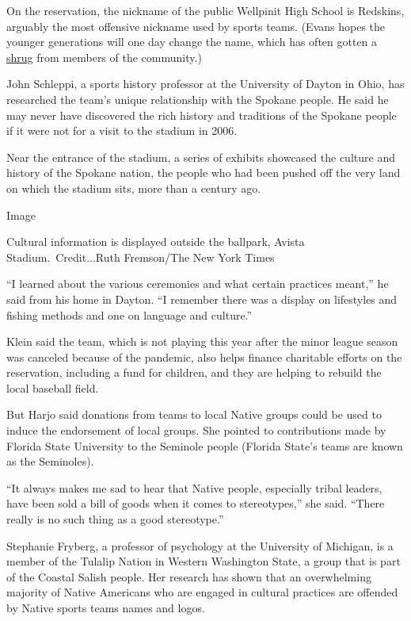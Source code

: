 On the reservation, the nickname of the public Wellpinit High School is
Redskins, arguably the most offensive nickname used by sports teams.
(Evans hopes the younger generations will one day change the name, which
has often gotten a
\href{https://www.spokesman.com/stories/2014/jul/02/for-wellpinit-students-redskins-a-source-of-pride/}{shrug}
from members of the community.)

John Schleppi, a sports history professor at the University of Dayton in
Ohio, has researched the team's unique relationship with the Spokane
people. He said he may never have discovered the rich history and
traditions of the Spokane people if it were not for a visit to the
stadium in 2006.

Near the entrance of the stadium, a series of exhibits showcased the
culture and history of the Spokane nation, the people who had been
pushed off the very land on which the stadium sits, more than a century
ago.

Image

Cultural information is displayed outside the ballpark, Avista
Stadium.~Credit...Ruth Fremson/The New York Times

``I learned about the various ceremonies and what certain practices
meant,'' he said from his home in Dayton. ``I remember there was a
display on lifestyles and fishing methods and one on language and
culture.''

Klein said the team, which is not playing this year after the minor
league season was canceled because of the pandemic, also helps finance
charitable efforts on the reservation, including a fund for children,
and they are helping to rebuild the local baseball field.

But Harjo said donations from teams to local Native groups could be used
to induce the endorsement of local groups. She pointed to contributions
made by Florida State University to the Seminole people (Florida State's
teams are known as the Seminoles).

``It always makes me sad to hear that Native people, especially tribal
leaders, have been sold a bill of goods when it comes to stereotypes,''
she said. ``There really is no such thing as a good stereotype.''

Stephanie Fryberg, a professor of psychology at the University of
Michigan, is a member of the Tulalip Nation in Western Washington State,
a group that is part of the Coastal Salish people. Her research has
shown that an overwhelming majority of Native Americans who are engaged
in cultural practices are offended by Native sports teams names and
logos.

